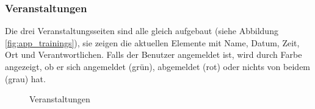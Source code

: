 \subsubsection{Veranstaltungen}
Die drei Veranstaltungsseiten sind alle gleich aufgebaut (siehe Abbildung \ref{fig:app_trainings}), sie zeigen die aktuellen Elemente mit Name, Datum, Zeit, Ort und Verantwortlichen. Falls der Benutzer angemeldet ist, wird durch Farbe angezeigt, ob er sich angemeldet (grün), abgemeldet (rot) oder nichts von beidem (grau) hat.
\begin{figure}[ht]
\centering
{}
\label{fig:app_singinobjects}
\caption{Veranstaltungen}
\end{figure}

